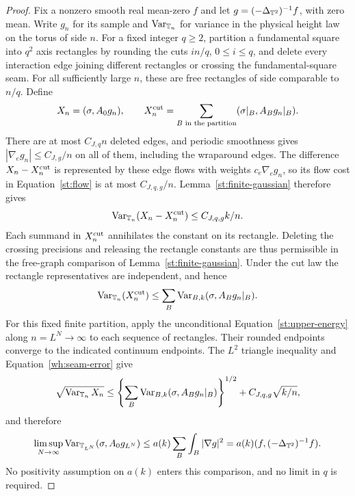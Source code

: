\begin{proof}
Fix a nonzero smooth real mean-zero $f$ and let
$g=(-\Delta_{\mathbb T^2})^{-1}f$, with zero mean.  Write $g_n$ for its
sample and $\operatorname{Var}_{\mathbb T_n}$ for variance in the physical height law
on the torus of side $n$.  For a fixed integer $q\ge2$, partition a
fundamental square into $q^2$ axis rectangles by rounding the cuts
$in/q$, $0\le i\le q$, and delete every interaction edge joining
different rectangles or crossing the fundamental-square seam.
For all sufficiently large $n$, these are free rectangles of
side comparable to $n/q$.  Define
\[
 X_n=(\sigma,A_0g_n),\qquad
 X_n^{\rm cut}=\sum_{B\text{ in the partition}}
                      (\sigma|_B,A_Bg_n|_B).
\]
There are at most $C_{J,q}n$ deleted edges, and periodic smoothness
gives $|\nabla_e g_n|\le C_{J,g}/n$ on all of them, including
the wraparound edges.  The difference $X_n-X_n^{\rm cut}$ is
represented by these edge flows with weights $c_e\nabla_e g_n$,
so its flow cost in Equation~\eqref{st:flow} is at most
$C_{J,q,g}/n$.  Lemma~\ref{st:finite-gaussian} therefore gives
\begin{equation}\label{wh:seam-error}
 \operatorname{Var}_{\mathbb T_n}(X_n-X_n^{\rm cut})\le C_{J,q,g}k/n.
\end{equation}
Each summand in $X_n^{\rm cut}$ annihilates the constant on its
rectangle.  Deleting the crossing precisions and releasing the
rectangle constants are thus permissible in the free-graph
comparison of Lemma~\ref{st:finite-gaussian}.  Under the cut law
the rectangle representatives are independent, and hence
\[
 \operatorname{Var}_{\mathbb T_n}(X_n^{\rm cut})
   \le\sum_B\operatorname{Var}_{B,k}(\sigma,A_Bg_n|_B).
\]
For this fixed finite partition, apply the unconditional
Equation~\eqref{st:upper-energy} along $n=L^N\to\infty$ to
each sequence of rectangles.  Their rounded endpoints converge
to the indicated continuum endpoints.  The $L^2$ triangle
inequality and Equation~\eqref{wh:seam-error} give
\[
 \sqrt{\operatorname{Var}_{\mathbb T_n}X_n}
 \le\left\{\sum_B\operatorname{Var}_{B,k}(\sigma,A_Bg_n|_B)\right\}^{1/2}
       +C_{J,q,g}\sqrt{k/n},
\]
and therefore
\begin{equation}\label{wh:unconditional-torus-upper}
 \limsup_{N\to\infty}\operatorname{Var}_{\mathbb T_{L^N}}(\sigma,A_0g_{L^N})
      \le a(k)\sum_B\int_B|\nabla g|^2
      =a(k)(f,(-\Delta_{\mathbb T^2})^{-1}f).
\end{equation}
No positivity assumption on $a(k)$ enters this comparison, and
no limit in $q$ is required.


\end{proof}

